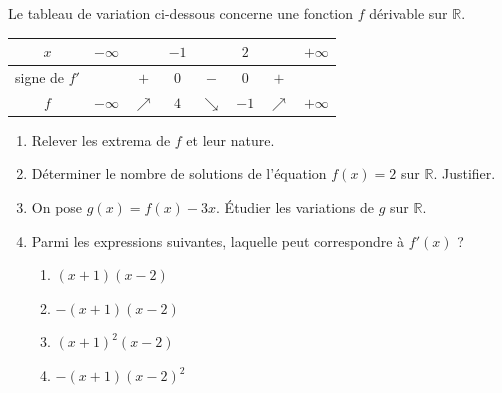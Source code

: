 \documentclass[11pt]{article}
\begin{document}
\begin{exercice}
Le tableau de variation ci-dessous concerne une fonction $f$ dérivable sur $\mathbb{R}$.

\begin{tabular}{|c|ccccccc|}
\hline
$x$ & $-\infty$ & & $-1$ & & $2$ & & $+\infty$ \\
\hline
signe de $f'$ & & $+$ & $0$ & $-$ & $0$ & $+$ & \\
\hline
$f$ & $-\infty$ & $\nearrow$ & $4$ & $\searrow$ & $-1$ & $\nearrow$ & $+\infty$ \\
\hline
\end{tabular}

\begin{enumerate}
    \item Relever les extrema de $f$ et leur nature.
    \item Déterminer le nombre de solutions de l'équation $f(x) = 2$ sur $\mathbb{R}$. Justifier.
    \item On pose $g(x) = f(x) - 3x$. Étudier les variations de $g$ sur $\mathbb{R}$.
    \item Parmi les expressions suivantes, laquelle peut correspondre à $f'(x)$ ?
    \begin{enumerate}
        \item $(x+1)(x-2)$
        \item $-(x+1)(x-2)$
        \item $(x+1)^2(x-2)$
        \item $-(x+1)(x-2)^2$
    \end{enumerate}
\end{enumerate}
\end{exercice}
\end{document}
